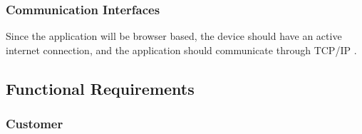 \subsubsection{Communication Interfaces}

Since the application will be browser based, the device should have an active internet connection, and the application should communicate through TCP/IP .

\subsection{Functional Requirements}



\subsubsection{Customer}

